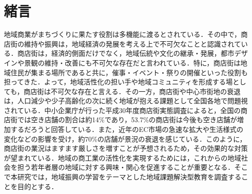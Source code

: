 \section{緒言}

地域商業がまちづくりに果たす役割は多機能に渡るとされている．その中で，商店街の維持や振興は，地域経済の発展を考える上で不可欠なことと認識されている．商店街は，経済的側面だけでなく，地域伝統や文化の継承・発展，都市デザインや景観の維持・改善にも不可欠な存在だと言われている．特に，商店街は地域住民が集まる場所であると共に，催事・イベント・祭りの開催といった役割も担ってきた．よって，地域活性化の担い手や地域コミュニティを形成する場としても，商店街は不可欠な存在と言える．その一方，商店街や中心市街地の衰退は，人口減少や少子高齢化の次に続く地域が抱える課題として全国各地で問題視されている．中小企業庁が行った平成30年度商店街実態調査によると，全国の商店街では空き店舗の割合は約14\%であり，53.7\%の商店街は今後も空き店舗が増加するだろうと回答している．また，近年のEC市場の急速な拡大や生活様式の変化などの影響を受け，約70\%の店舗が景況の衰退を感じている．このように，商店街の業況はますます厳しさを増すことが予想されるため，その効果的な対策が望まれている．地域の商工業の活性化を実現するためには，これからの地域社会を担う若年者層の地域に対する興味・関心を促進することが重要となる．そこで本研究では，地域振興の学習をテーマとした地域課題解決型教育を調査することを目的とする．